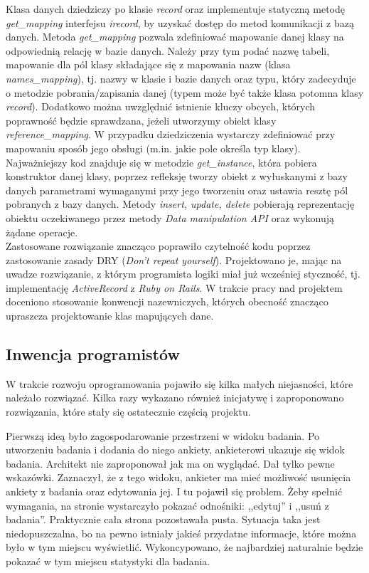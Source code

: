 Klasa danych dziedziczy po klasie \emph{record} oraz implementuje statyczną metodę \emph{get\_mapping} interfejsu \emph{irecord}, by uzyskać dostęp do metod komunikacji z bazą danych. Metoda \emph{get\_mapping} pozwala zdefiniować mapowanie danej klasy na odpowiednią relację w bazie danych. Należy przy tym podać nazwę tabeli, mapowanie dla pól klasy składające się z mapowania nazw (klasa \emph{names\_mapping}), tj. nazwy w klasie i bazie danych oraz typu, który zadecyduje o metodzie pobrania/zapisania danej (typem może być także klasa potomna klasy \emph{record}). Dodatkowo można uwzględnić istnienie kluczy obcych, których poprawność będzie sprawdzana, jeżeli utworzymy obiekt klasy \emph{reference\_mapping}. W przypadku dziedziczenia wystarczy zdefiniować przy mapowaniu sposób jego obsługi (m.in. jakie pole określa typ klasy). Najważniejszy kod znajduje się w metodzie \emph{get\_instance}, która pobiera konstruktor danej klasy, poprzez refleksję tworzy obiekt z wyłuskanymi z bazy danych parametrami wymaganymi przy jego tworzeniu oraz ustawia resztę pól pobranych z bazy danych. Metody \emph{insert, update, delete} pobierają reprezentację obiektu oczekiwanego przez metody \emph{Data manipulation API} oraz wykonują żądane operacje.\\
Zastosowane rozwiązanie znacząco poprawiło czytelność kodu poprzez zastosowanie zasady DRY (\emph{Don't repeat yourself}). Projektowano je, mając na uwadze rozwiązanie, z którym programista logiki miał już wcześniej styczność, tj. implementację \emph{ActiveRecord} z \emph{Ruby on Rails}. W trakcie pracy nad projektem doceniono stosowanie konwencji nazewniczych, których obecność znacząco upraszcza projektowanie klas mapujących dane.

\subsection{Inwencja programistów}
\label{Chapter62d}

W trakcie rozwoju oprogramowania pojawiło się kilka małych niejasności, które należało rozwiązać. Kilka razy wykazano również inicjatywę i zaproponowano rozwiązania, które stały się ostatecznie częścią projektu.

Pierwszą ideą było zagospodarowanie przestrzeni w widoku badania. Po utworzeniu badania i dodania do niego ankiety, ankieterowi ukazuje się widok badania. Architekt nie zaproponował jak ma on wyglądać. Dał tylko pewne wskazówki. Zaznaczył, że z tego widoku, ankieter ma mieć możliwość usunięcia ankiety z badania oraz edytowania jej. I tu pojawił się problem. Żeby spełnić wymagania, na stronie wystarczyło pokazać odnośniki: ,,edytuj'' i ,,usuń z badania''. Praktycznie cała strona pozostawała pusta. Sytuacja taka jest niedopuszczalna, bo na pewno istniały jakieś przydatne informacje, które można było w tym miejscu wyświetlić. Wykoncypowano, że najbardziej naturalnie będzie pokazać w tym miejscu statystyki dla badania.

